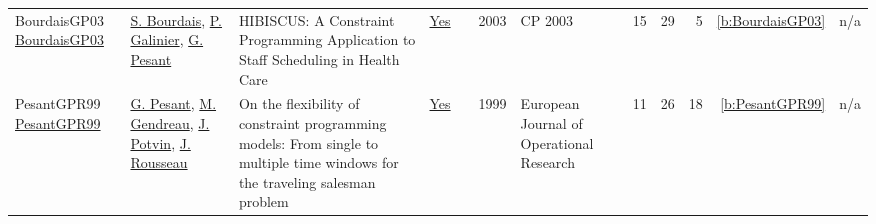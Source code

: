 {\begin{longtable}{>{\raggedright\arraybackslash}p{3cm}>{\raggedright\arraybackslash}p{6cm}>{\raggedright\arraybackslash}p{6.5cm}rrrp{2.5cm}rrrrr}
BourdaisGP03 \href{https://doi.org/10.1007/978-3-540-45193-8_11}{BourdaisGP03} & \hyperref[auth:a1224]{S. Bourdais}, \hyperref[auth:a1225]{P. Galinier}, \hyperref[auth:a8]{G. Pesant} & {HIBISCUS:} {A} Constraint Programming Application to Staff Scheduling in Health Care & \href{../works/BourdaisGP03.pdf}{Yes} & \cite{BourdaisGP03} & 2003 & CP 2003 & 15 & 29 & 5 & \ref{b:BourdaisGP03} & n/a\\
PesantGPR99 \href{http://dx.doi.org/10.1016/s0377-2217(98)00248-3}{PesantGPR99} & \hyperref[auth:a8]{G. Pesant}, \hyperref[auth:a622]{M. Gendreau}, \hyperref[auth:a1222]{J. Potvin}, \hyperref[auth:a1223]{J. Rousseau} & On the flexibility of constraint programming models: From single to multiple time windows for the traveling salesman problem & \href{../works/PesantGPR99.pdf}{Yes} & \cite{PesantGPR99} & 1999 & European Journal of Operational Research & 11 & 26 & 18 & \ref{b:PesantGPR99} & n/a\\
\end{longtable}
}

\clearpage
